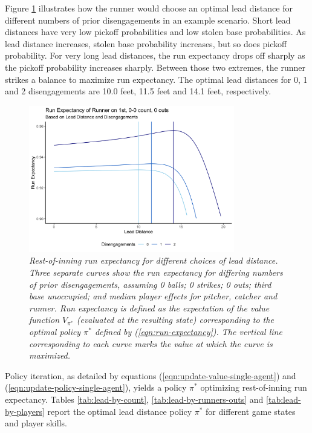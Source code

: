 \documentclass{article}
\begin{document}
      Figure \ref{fig:finding-optimal-lead} illustrates how the runner would choose an optimal lead distance for different numbers of prior disengagements in an example scenario. Short lead distances have very low pickoff probabilities and low stolen base probabilities. As lead distance increases, stolen base probability increases, but so does pickoff probability. For very long lead distances, the run expectancy drops off sharply as the pickoff probability increases sharply. Between those two extremes, the runner strikes a balance to maximize run expectancy. The optimal lead distances for 0, 1 and 2 disengagements are 10.0 feet, 11.5 feet and 14.1 feet, respectively.
      
      \begin{figure}
        \centering
        \includegraphics[width = 0.8\textwidth]{../../output/figures/finding_optimal_lead.png}
        \caption{
          \it Rest-of-inning run expectancy for different choices of lead distance. Three separate curves show the run expectancy for differing numbers of prior disengagements, assuming 0 balls; 0 strikes; 0 outs; third base unoccupied; and median player effects for pitcher, catcher and runner. Run expectancy is defined as the expectation of the value function $V_{\pi^*}$ (evaluated at the resulting state) corresponding to the optimal policy $\pi^*$ defined by (\ref{eqn:run-expectancy}). The vertical line corresponding to each curve marks the value at which the curve is maximized.
        }
        \label{fig:finding-optimal-lead}
      \end{figure}

      Policy iteration, as detailed by equations (\ref{eqn:update-value-single-agent}) and (\ref{eqn:update-policy-single-agent}), yields a policy $\pi^*$ optimizing rest-of-inning run expectancy. Tables \ref{tab:lead-by-count}, \ref{tab:lead-by-runners-outs} and \ref{tab:lead-by-players} report the optimal lead distance policy $\pi^*$ for different game states and player skills.
    
\end{document}
